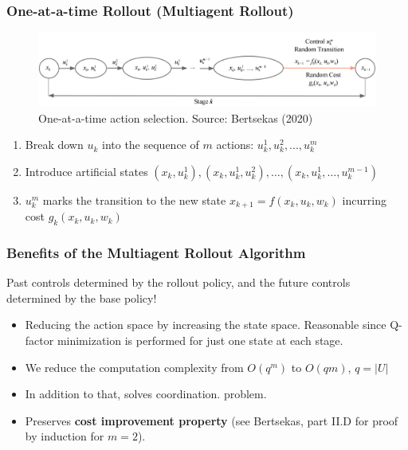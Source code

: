 \documentclass{beamer}
\begin{document}





    \begin{frame}
        \frametitle{One-at-a-time Rollout (Multiagent Rollout)}

        \begin{figure}
            \includegraphics[scale=0.4]{2b}
            \caption{One-at-a-time action selection. Source: Bertsekas (2020)}
        \end{figure}


        \begin{enumerate}
            \item Break down $u_k$ into the sequence of $m$ actions:
            $u^1_k, u^2_k, ..., u^m_k$

            \item Introduce artificial states $\left(x_{k}, u_{k}^{1}\right),\left(x_{k}, u_{k}^{1}, u_{k}^{2}\right), \ldots,\left(x_{k}, u_{k}^{1}, \ldots, u_{k}^{m-1}\right)$
            \item $u^m_k$ marks the transition to the new state
            $x_{k+1}=f(x_k, u_k, w_k)$ incurring cost $g_k(x_k, u_k, w_k)$
        \end{enumerate}


    \end{frame}



    \begin{frame}
        \frametitle{Benefits of the Multiagent Rollout Algorithm}

        Past controls determined by
        the rollout policy, and the future controls determined by
        the base policy!



        \begin{itemize}
            \item Reducing the action space by increasing the state space. Reasonable since Q-factor minimization is performed for just
            one state at each stage.

            \item We reduce the computation complexity
            from $O(q^m)$ to $O(qm)$, $q=|U|$

            \item In addition to that, solves coordination.
            problem.

            \item Preserves \textbf{cost improvement property}
            (see Bertsekas, part II.D
            for proof by induction for $m=2$).

        \end{itemize}


    \end{frame}
\end{document}
